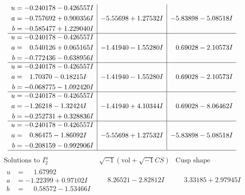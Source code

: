 \documentclass[1p]{elsarticle_modified}
\theoremstyle{definition}
\newcommand{\I}{\sqrt{-1}}
\begin{document}
$$\begin{array}{c|c|c}
\begin{aligned}
u &= -0.240178 - 0.426557 I \\
a &= -0.757692 + 0.900356 I \\
b &= -0.585477 + 1.229040 I\end{aligned}
 & -5.55698 + 1.27532 I & -5.83898 - 5.08518 I \\ \hline\begin{aligned}
u &= -0.240178 - 0.426557 I \\
a &= \phantom{-}0.540126 + 0.065165 I \\
b &= -0.772436 - 0.638956 I\end{aligned}
 & -1.41940 - 1.55280 I & \phantom{-}0.69028 - 2.10573 I \\ \hline\begin{aligned}
u &= -0.240178 - 0.426557 I \\
a &= \phantom{-}1.70370 - 0.18215 I \\
b &= -0.068775 - 1.092420 I\end{aligned}
 & -1.41940 - 1.55280 I & \phantom{-}0.69028 - 2.10573 I \\ \hline\begin{aligned}
u &= -0.240178 - 0.426557 I \\
a &= -1.26218 - 1.32424 I \\
b &= -0.252731 + 0.328836 I\end{aligned}
 & -1.41940 + 4.10344 I & \phantom{-}0.69028 - 8.06462 I \\ \hline\begin{aligned}
u &= -0.240178 - 0.426557 I \\
a &= \phantom{-}0.86475 - 1.86092 I \\
b &= -0.208159 - 0.992906 I\end{aligned}
 & -5.55698 + 1.27532 I & -5.83898 - 5.08518 I\\
 \hline 
 \end{array}$$\newpage$$\begin{array}{c|c|c}  
\text{Solutions to }I^u_{2}& \I (\text{vol} + \sqrt{-1}CS) & \text{Cusp shape}\\
 \hline 
\begin{aligned}
u &= \phantom{-}1.67992\phantom{ +0.000000I} \\
a &= -1.22399 + 0.97102 I \\
b &= \phantom{-}0.58572 - 1.53466 I\end{aligned}
 & \phantom{-}8.26521 - 2.82812 I & \phantom{-}3.33185 + 2.97945 I \\ \hline\begin{aligned}

\end{aligned}
\end{array}$$
\end{document}
